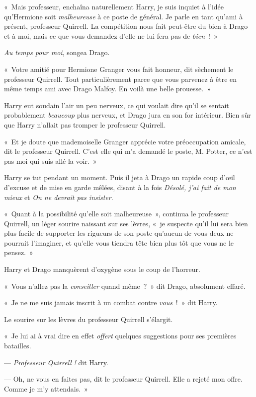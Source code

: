 «~Mais professeur, enchaîna naturellement Harry, je suis inquiet à l'idée qu'Hermione soit \emph{malheureuse} à ce poste de général.
Je parle en tant qu'ami à présent, professeur Quirrell.
La compétition nous fait peut-être du bien à Drago et à moi, mais ce que vous demandez d'elle ne lui fera pas de \emph{bien}~!~»

\emph{Au temps pour moi}, songea Drago.

«~Votre amitié pour Hermione Granger vous fait honneur, dit sèchement le professeur Quirrell.
Tout particulièrement parce que vous parvenez à être en même temps ami avec Drago Malfoy.
En voilà une belle prouesse.~»

Harry eut soudain l'air un peu nerveux, ce qui voulait dire qu'il se sentait probablement \emph{beaucoup} plus nerveux, et Drago jura en son for intérieur.
Bien sûr que Harry n'allait pas tromper le professeur Quirrell.

«~Et je doute que mademoiselle Granger apprécie votre préoccupation amicale, dit le professeur Quirrell.
C'est elle qui m'a demandé le poste, M. Potter, ce n'est pas moi qui suis allé la voir.~»

Harry se tut pendant un moment.
Puis il jeta à Drago un rapide coup d'œil d'excuse et de mise en garde mêlées, disant à la fois \emph{Désolé, j'ai fait de mon mieux} et \emph{On ne devrait pas insister}.

«~Quant à la possibilité qu'elle soit malheureuse~», continua le professeur Quirrell, un léger sourire naissant sur ses lèvres, «~je suspecte qu'il lui sera bien plus facile de supporter les rigueurs de son poste qu'aucun de vous deux ne pourrait l'imaginer, et qu'elle vous tiendra tête bien plus tôt que vous ne le pensez.~»

Harry et Drago manquèrent d'oxygène sous le coup de l'horreur.

«~Vous n'allez pas la \emph{conseiller} quand même~?~»
dit Drago, absolument effaré.

«~Je ne me suis jamais inscrit à un combat contre \emph{vous}~!~»
dit Harry.

Le sourire sur les lèvres du professeur Quirrell s'élargit.

«~Je lui ai à vrai dire en effet \emph{offert} quelques suggestions pour ses premières batailles.

--- \emph{Professeur Quirrell} \emph{!} dit Harry.

--- Oh, ne vous en faites pas, dit le professeur Quirrell.
Elle a rejeté mon offre.
Comme je m'y attendais.~»

